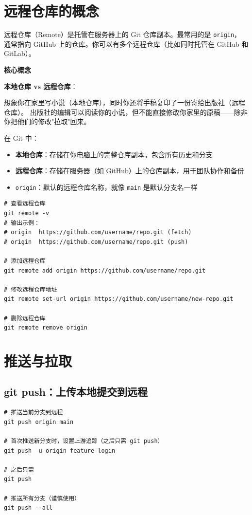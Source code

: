\documentclass[12pt,a4paper,openany]{ctexbook}
\newenvironment{keybox}{%
  \medskip
  \noindent\textbf{\faKey\; 核心概念}
  \smallskip
}{%
  \medskip
}
\begin{document}
\section{远程仓库的概念}

远程仓库（Remote）是托管在服务器上的 Git 仓库副本。最常用的是 \texttt{origin}，
通常指向 GitHub 上的仓库。你可以有多个远程仓库（比如同时托管在 GitHub 和 GitLab）。

\begin{keybox}
\textbf{本地仓库 vs 远程仓库}：

想象你在家里写小说（本地仓库），同时你还将手稿复印了一份寄给出版社（远程仓库）。
出版社的编辑可以阅读你的小说，但不能直接修改你家里的原稿——除非你把他们的修改"拉取"回来。

在 Git 中：
\begin{itemize}
  \item \textbf{本地仓库}：存储在你电脑上的完整仓库副本，包含所有历史和分支
  \item \textbf{远程仓库}：存储在服务器（如 GitHub）上的仓库副本，用于团队协作和备份
  \item \texttt{origin}：默认的远程仓库名称，就像 \texttt{main} 是默认分支名一样
\end{itemize}
\end{keybox}

\begin{lstlisting}[style=shell]
# 查看远程仓库
git remote -v
# 输出示例：
# origin  https://github.com/username/repo.git (fetch)
# origin  https://github.com/username/repo.git (push)

# 添加远程仓库
git remote add origin https://github.com/username/repo.git

# 修改远程仓库地址
git remote set-url origin https://github.com/username/new-repo.git

# 删除远程仓库
git remote remove origin
\end{lstlisting}

\section{推送与拉取}

\subsection{git push：上传本地提交到远程}

\begin{lstlisting}[style=shell]
# 推送当前分支到远程
git push origin main

# 首次推送新分支时，设置上游追踪（之后只需 git push）
git push -u origin feature-login

# 之后只需
git push

# 推送所有分支（谨慎使用）
git push --all
\end{lstlisting}
\end{document}

